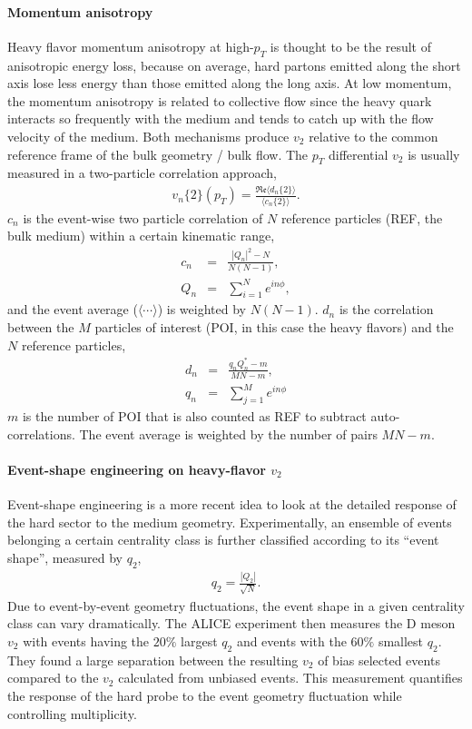 \paragraph{Momentum anisotropy}
Heavy flavor momentum anisotropy at high-$p_T$ is thought to be the result of anisotropic energy loss, because on average, hard partons emitted along the short axis lose less energy than those emitted along the long axis.
At low momentum, the momentum anisotropy is related to collective flow since the heavy quark interacts so frequently with the medium and tends to catch up with the flow velocity of the medium.
Both mechanisms produce $v_2$ relative to the common reference frame of the bulk geometry / bulk flow.
The $p_T$ differential $v_2$ is usually measured in a two-particle correlation approach,
\begin{eqnarray}
v_n\{2\}(p_T) = \frac{\mathfrak{Re}\langle d_n\{2\} \rangle}{\langle c_n\{2\}\rangle}.
\end{eqnarray}
$c_n$ is the event-wise two particle correlation of $N$ reference particles (REF, the bulk medium) within a certain kinematic range,
\begin{eqnarray}
c_n &=& \frac{|Q_n|^2 - N}{N(N-1)},  \\
Q_n &=& \sum_{i=1}^N e^{i n \phi},
\end{eqnarray}
and the event average ($\langle\cdots\rangle$) is weighted by $N(N-1)$.
$d_n$ is the correlation between the $M$ particles of interest (POI, in this case the heavy flavors) and the $N$ reference particles,
\begin{eqnarray}
d_n &=& \frac{q_n Q_n^* - m}{MN-m},  \\
q_n &=& \sum_{j=1}^M e^{i n \phi}
\end{eqnarray}
$m$ is the number of POI that is also counted as REF to subtract auto-correlations. 
The event average is weighted by the number of pairs $MN-m$.

\paragraph{Event-shape engineering on heavy-flavor $v_2$}
Event-shape engineering is a more recent idea to look at the detailed response of the hard sector to the medium geometry.
Experimentally, an ensemble of events belonging a certain centrality class is further classified according to its ``event shape'', measured by $q_2$,
\begin{eqnarray}
q_2 = \frac{|Q_2|}{\sqrt{N}}.
\end{eqnarray}
Due to event-by-event geometry fluctuations, the event shape in a given centrality class can vary dramatically.
The ALICE experiment then measures the D meson $v_2$ with events having the $20\%$ largest $q_2$ and events with the $60\%$ smallest $q_2$.
They found a large separation between the resulting $v_2$ of bias selected events compared to the $v_2$ calculated from unbiased events.
This measurement quantifies the response of the hard probe to the event geometry fluctuation while controlling multiplicity. 


